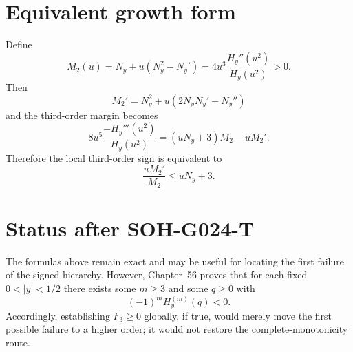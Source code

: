 \section{Equivalent growth form}
Define
\[
M_2(u)=N_y+u(N_y^2-N_y')
=4u^3\frac{H_y''(u^2)}{H_y(u^2)}>0.
\]
Then
\[
M_2'=N_y^2+u(2N_yN_y'-N_y'')
\]
and the third-order margin becomes
\[
\boxed{
8u^5\frac{-H_y'''(u^2)}{H_y(u^2)}
=(uN_y+3)M_2-uM_2'.}
\]
Therefore the local third-order sign is equivalent to
\[
\boxed{\frac{uM_2'}{M_2}\le uN_y+3.}
\]

\section{Status after SOH-G024-T}
The formulas above remain exact and may be useful for locating the first failure of the signed hierarchy. However, Chapter~56 proves that for each fixed $0<|y|<1/2$ there exists some $m\ge3$ and some $q\ge0$ with
\[
(-1)^mH_y^{(m)}(q)<0.
\]
Accordingly, establishing $F_3\ge0$ globally, if true, would merely move the first possible failure to a higher order; it would not restore the complete-monotonicity route.


